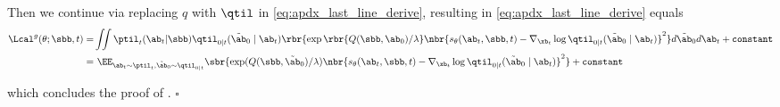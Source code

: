 Then we continue via replacing $q$ with $\qtil$ in \eqref{eq:apdx_last_line_derive}, resulting in \eqref{eq:apdx_last_line_derive} equals 
\begin{align}
    \Lcal^g(\theta;\sbb,t) = & \iint \ptil_t(\ab_t|\sbb)\qtil_{0|t}(\tilde\ab_0\mid \ab_t)\rbr{{\exp\rbr{Q(\sbb,\ab_0)/\lambda}}\nbr{s_\theta(\ab_t,\sbb, t) -  \nabla_{\xb_t}\log \qtil_{0|t}(\tilde\ab_0\mid \ab_t)}^2  } d\tilde\ab_0d\ab_t+\texttt{constant}\notag \\
    = &~\EE_{\ab_t\sim \ptil_t, \tilde\ab_0\sim \qtil_{0|t}}\sbr{{\exp(Q(\sbb,\tilde\ab_0)/\lambda)}\nbr{s_\theta(\ab_t,\sbb, t) -  \nabla_{\xb_t}\log \qtil_{0|t}(\tilde\ab_0\mid \ab_t)}^2  } +\texttt{constant}\label{eq:appendix_derivation_second_last}
\end{align}

which concludes the proof of . \hfill$\square$

 
